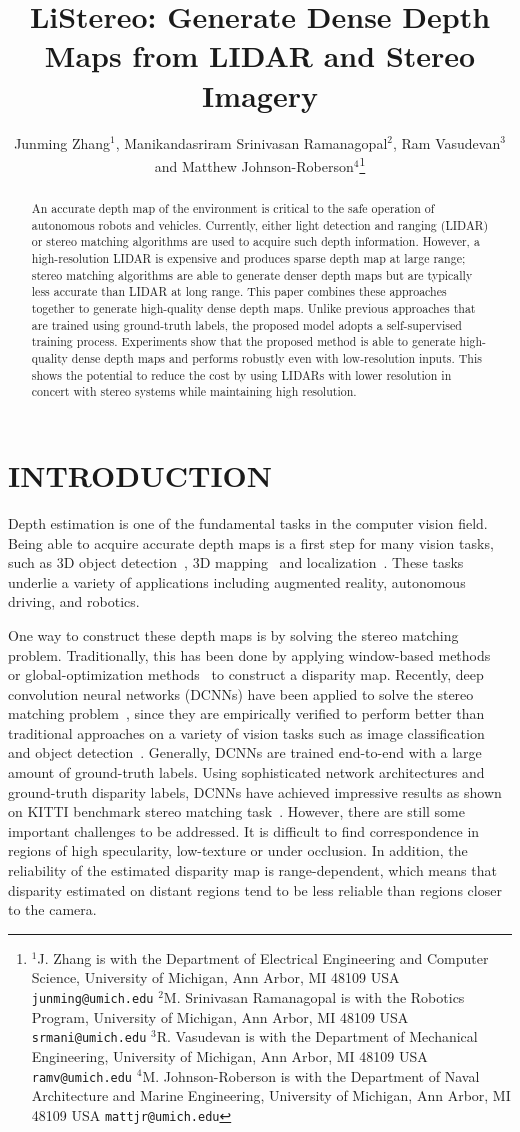 \documentclass[letterpaper, 10 pt, conference]{ieeeconf}
\title{\LARGE \bf
LiStereo: Generate Dense Depth Maps from LIDAR and Stereo Imagery
}
\author{Junming Zhang$^{1}$, Manikandasriram Srinivasan Ramanagopal$^{2}$, Ram Vasudevan$^{3}$ and Matthew Johnson-Roberson$^{4}$\thanks{
$^{1}$J. Zhang is with the Department of Electrical Engineering and Computer Science, University of Michigan, Ann Arbor, MI 48109 USA {\tt\small junming@umich.edu}
\newline \indent $^{2}$M. Srinivasan Ramanagopal is with the Robotics Program, University of Michigan, Ann Arbor, MI 48109 USA {\tt\small srmani@umich.edu}
\newline \indent $^{3}$R. Vasudevan is with the Department of Mechanical Engineering, University of Michigan, Ann Arbor, MI 48109 USA {\tt\small ramv@umich.edu}
\newline \indent $^{4}$M. Johnson-Roberson is with the Department of Naval Architecture and Marine Engineering, University of Michigan, Ann Arbor, MI 48109 USA {\tt\small mattjr@umich.edu}}
}
\begin{document}
\maketitle

\begin{abstract}
    An accurate depth map of the environment is critical to the safe operation of autonomous robots and vehicles. Currently, either light detection and ranging (LIDAR) or stereo matching algorithms are used to acquire such depth information. However, a high-resolution LIDAR is expensive and produces sparse depth map at large range; stereo matching algorithms are able to generate denser depth maps but are typically less accurate than LIDAR at long range. This paper combines these approaches together to generate high-quality dense depth maps. Unlike previous approaches that are trained using ground-truth labels, the proposed model adopts a self-supervised training process. Experiments show that the proposed method is able to generate high-quality dense depth maps and performs robustly even with low-resolution inputs. This shows the potential to reduce the cost by using LIDARs with lower resolution in concert with stereo systems while maintaining high resolution.
\end{abstract}


\section{INTRODUCTION}
    Depth estimation is one of the fundamental tasks in the computer vision field. Being able to acquire accurate depth maps is a first step for many vision tasks, such as 3D object detection~\cite{ku2018joint}, 3D mapping~\cite{zhang2015visual} and localization~\cite{wolcott2014visual}. These tasks underlie a variety of applications including augmented reality, autonomous driving, and robotics. 

    One way to construct these depth maps is by solving the stereo matching problem. 
Traditionally, this has been done by applying window-based methods~\cite{adhyapak2007stereo} or global-optimization methods~\cite{semiglobal} to construct a disparity map. Recently, deep convolution neural networks (DCNNs) have been applied to solve the stereo matching problem~\cite{zbontar2016stereo, mayer2016large}, since they are empirically verified to perform better than traditional approaches on a variety of vision tasks such as image classification~\cite{resnet} and object detection~\cite{MaskRCNN}. Generally, DCNNs are trained end-to-end with a large amount of ground-truth labels. Using sophisticated network architectures and ground-truth disparity labels, DCNNs have achieved impressive results as shown on KITTI benchmark stereo matching task~\cite{menze2015object}. However, there are still some important challenges to be addressed. It is difficult to find correspondence in regions of high specularity, low-texture or under  occlusion. In addition, the reliability of the estimated disparity map is range-dependent, which means that disparity estimated on distant regions tend to be less reliable than regions closer to the camera.
    
\end{document}
